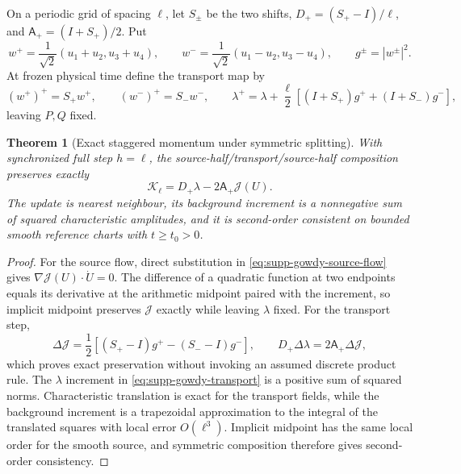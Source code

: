 \documentclass[11pt]{article}
\newtheorem{theorem}{Theorem}[section]
\numberwithin{equation}{section}
\theoremstyle{definition}
\theoremstyle{remark}
\begin{document}
On a periodic grid of spacing $\ell$, let $S_\pm$ be the two shifts,
$D_+=(S_+-I)/\ell$, and $\mathsf A_+=(I+S_+)/2$.  Put
\begin{equation}
 w^+=\frac1{\sqrt2}(u_1+u_2,u_3+u_4),\qquad
 w^-=\frac1{\sqrt2}(u_1-u_2,u_3-u_4),\qquad
 g^\pm=|w^\pm|^2.
 \label{eq:supp-gowdy-characteristics}
\end{equation}
At frozen physical time define the transport map by
\begin{equation}
 (w^+)^+=S_+w^+,
 \qquad (w^-)^+=S_-w^-,
 \qquad
 \lambda^+=\lambda+\frac\ell2
 [(I+S_+)g^++(I+S_-)g^-],
 \label{eq:supp-gowdy-transport}
\end{equation}
leaving $P,Q$ fixed.

\begin{theorem}[Exact staggered momentum under symmetric splitting]
\label{thm:supp-gowdy-momentum}
With synchronized full step $h=\ell$, the source-half/transport/source-half
composition preserves exactly
\begin{equation}
 \mathcal K_\ell
 =D_+\lambda-2\mathsf A_+\mathcal J(U).
 \label{eq:supp-gowdy-staggered-momentum}
\end{equation}
The update is nearest neighbour, its background increment is a nonnegative sum
of squared characteristic amplitudes, and it is second-order consistent on
bounded smooth reference charts with $t\ge t_0>0$.
\end{theorem}

\begin{proof}
For the source flow, direct substitution in
\eqref{eq:supp-gowdy-source-flow} gives
$\nabla\mathcal J(U)\cdot\dot U=0$.  The difference of a quadratic function at
two endpoints equals its derivative at the arithmetic midpoint paired with the
increment, so implicit midpoint preserves $\mathcal J$ exactly while leaving
$\lambda$ fixed.  For the transport step,
\begin{equation}
 \Delta\mathcal J
 =\frac12[(S_+-I)g^+-(S_--I)g^-],\qquad
 D_+\Delta\lambda=2\mathsf A_+\Delta\mathcal J,
 \label{eq:supp-gowdy-transport-identity}
\end{equation}
which proves exact preservation without invoking an assumed discrete product
rule.  The $\lambda$ increment in \eqref{eq:supp-gowdy-transport} is a positive
sum of squared norms.  Characteristic translation is exact for the transport
fields, while the background increment is a trapezoidal approximation to the
integral of the translated squares with local error $O(\ell^3)$.  Implicit
midpoint has the same local order for the smooth source, and symmetric
composition therefore gives second-order consistency.
\end{proof}
\end{document}
